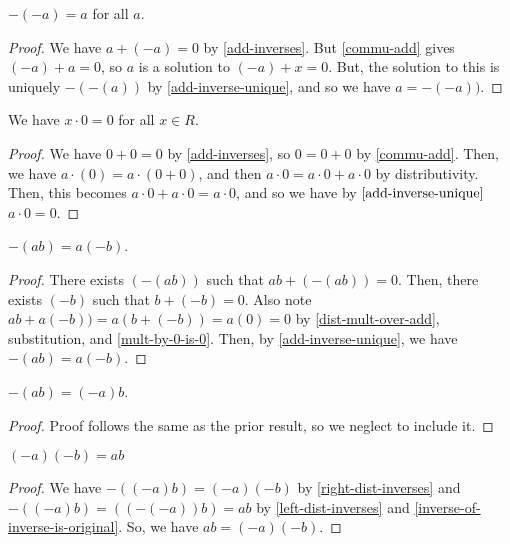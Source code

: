 \begin{theorem}\label{inverse-of-inverse-is-original}
    $-(-a) = a$ for all $a$. 
\end{theorem}
\begin{proof}
    We have $a + (-a) = 0$ by \ref{add-inverses}. But \ref{commu-add} gives $(-a) + a = 0$, so $a$ is a solution to $(-a) + x = 0$. But, the solution to this is uniquely $-(-(a))$ by \ref{add-inverse-unique}, and so we have $a = -(-a))$. 
\end{proof}

\begin{theorem}[Multiplication by $0$ is $0$]\label{mult-by-0-is-0}
    We have $x \cdot 0 = 0$ for all $x \in R$.
\end{theorem}
\begin{proof}
We have $0 + 0 = 0$ by \ref{add-inverses}, so $0=0+0$ by \ref{commu-add}. Then, we have $a \cdot (0) = a \cdot (0+0)$, and then $a \cdot 0 = a\cdot 0 + a\cdot 0$ by distributivity. Then, this becomes $a \cdot 0 + a \cdot 0 = a\cdot 0$, and so we have by $\ref{add-inverse-unique}$ $a \cdot 0= 0$. 
\end{proof}

\begin{theorem}\label{right-dist-inverses}
$-(ab) = a(-b)$.
\end{theorem}
\begin{proof}
There exists $(-(ab))$ such that $ab + (-(ab)) = 0$. Then, there exists $(-b)$ such that $b + (-b) = 0$. Also note $ab + a(-b)) = a(b+(-b)) = a(0) = 0$ by \ref{dist-mult-over-add}, substitution, and \ref{mult-by-0-is-0}. Then, by \ref{add-inverse-unique}, we have $-(ab) = a(-b)$.
\end{proof}

\begin{theorem}\label{left-dist-inverses}
$-(ab) = (-a)b$.
\end{theorem}
\begin{proof} Proof follows the same as the prior result, so we neglect to include it. 
\end{proof}

\begin{theorem}\label{inverses-mult-original}
$(-a)(-b) = ab$
\end{theorem}
\begin{proof}
We have $-((-a)b) = (-a)(-b)$ by \ref{right-dist-inverses} and $-((-a)b) = ((-(-a))b) = ab$ by \ref{left-dist-inverses} and \ref{inverse-of-inverse-is-original}. So, we have $ab = (-a)(-b)$. 
\end{proof}

